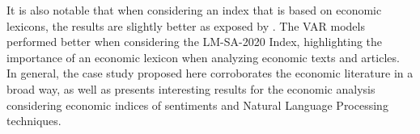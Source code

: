 It is also notable that when considering an index that is based on economic lexicons, the results are slightly better as exposed by \cite{loughran2011liability}. The VAR models performed better when considering the LM-SA-2020 Index, highlighting the importance of an economic lexicon when analyzing economic texts and articles.\\

In general, the case study proposed here corroborates the economic literature in a broad way, as well as presents interesting results for the economic analysis considering economic indices of sentiments and Natural Language Processing techniques.


